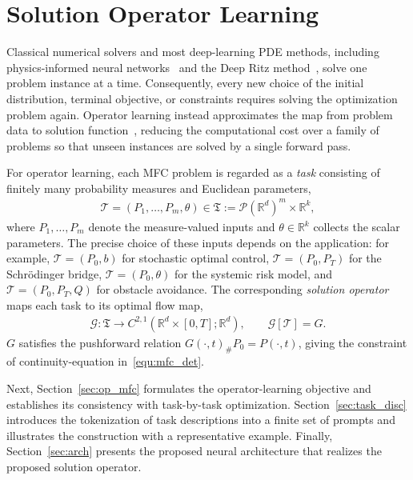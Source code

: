 \documentclass[preprint]{elsarticle}
\newcommand{\R}{\mathbb{R}}
\newcommand{\pr}{\mathscr{P}}
\newcommand{\sT}{\mathcal{T}}
\newcommand{\sG}{\mathcal{G}}
\begin{document}
\section{Solution Operator Learning}\label{sec:sol}

Classical numerical solvers and most deep-learning PDE methods, including physics-informed neural networks~\cite{raissi2019pinn,sirignano2018dgm} and the Deep Ritz method~\cite{weinan2018deepritz}, solve one problem instance at a time. Consequently, every new choice of the initial distribution, terminal objective, or constraints requires solving the optimization problem again. Operator learning instead approximates the map from problem data to solution function~\cite{lu2021deeponet,li2021fno}, reducing the computational cost over a family of problems so that unseen instances are solved by a single forward pass.

For operator learning, each MFC problem is regarded as a \emph{task} consisting of finitely many probability measures and Euclidean parameters,
\begin{align}
    \sT=(P_1,\ldots,P_m,\theta)
    \in
    \mathfrak T:=\pr(\R^d)^m\times\R^k,
    \label{equ:task_space}
\end{align}
where $P_1,\ldots,P_m$ denote the measure-valued inputs and $\theta\in\R^k$ collects the scalar parameters. The precise choice of these inputs depends on the application: for example, $\sT=(P_0,b)$ for stochastic optimal control, $\sT=(P_0,P_T)$ for the Schr\"odinger bridge, $\sT=(P_0,\theta)$ for the systemic risk model, and $\sT=(P_0,P_T,Q)$ for obstacle avoidance. The corresponding \emph{solution operator} maps each task to its optimal flow map,
\begin{align}
    \sG:\mathfrak T
    \longrightarrow
    C^{2,1}(\R^d\times[0,T];\R^d),
    \qquad
    \sG[\sT]=G.
    \label{equ:sol_op_def}
\end{align}
$G$ satisfies the pushforward relation $G(\cdot,t)_{\#}P_0 = P(\cdot,t)$, giving the constraint of continuity-equation in~\eqref{equ:mfc_det}.

Next, Section~\ref{sec:op_mfc} formulates the operator-learning objective and establishes its consistency with task-by-task optimization. Section~\ref{sec:task_disc} introduces the tokenization of task descriptions into a finite set of prompts and illustrates the construction with a representative example. Finally, Section~\ref{sec:arch} presents the proposed neural architecture that realizes the proposed solution operator.
\end{document}
